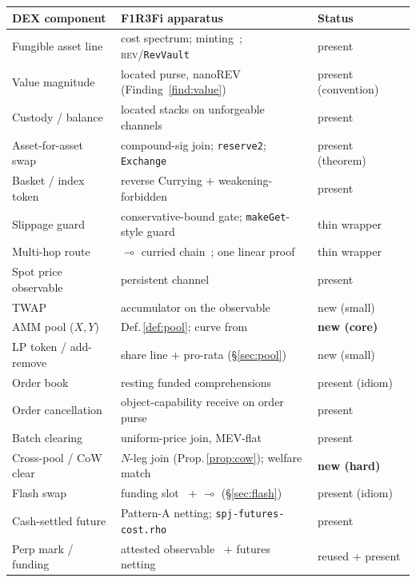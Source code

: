 \documentclass[11pt]{article}
\theoremstyle{definition}
\newcommand{\rev}{\textsc{rev}}
\newcommand{\lolli}{\ensuremath{\multimap}}
\begin{document}
\begin{table}[t]
\centering
\footnotesize
\setlength{\tabcolsep}{4pt}
\begin{tabular}{@{}p{}p{}p{}@{}}
\toprule
\textbf{DEX component} & \textbf{F1R3Fi apparatus} & \textbf{Status} \\
\midrule
Fungible asset line & cost spectrum; minting~\cite[\S2.4]{cost}; \rev/\texttt{RevVault} & present \\
Value magnitude & located purse, nanoREV (Finding~\ref{find:value}) & present (convention) \\
Custody / balance & located stacks on unforgeable channels~\cite[\S3.2]{finrho} & present \\
Asset-for-asset swap & compound-sig join; \texttt{reserve2}; \texttt{Exchange}~\cite[B.9]{cost} & present (theorem) \\
Basket / index token & reverse Currying + weakening-forbidden~\cite[\S4.8]{cost} & present \\
Slippage guard & conservative-bound gate; \texttt{makeGet}-style guard & thin wrapper \\
Multi-hop route & $\lolli$ curried chain~\cite[\S4.9]{cost}; one linear proof & thin wrapper \\
Spot price observable & persistent channel~\cite[\S2.2]{finrho} & present \\
TWAP & accumulator on the observable & new (small) \\
AMM pool ($X,Y$) & Def.\,\ref{def:pool}; curve from~\cite[\S6.1]{predmkt} & \textbf{new (core)} \\
LP token / add-remove & share line + pro-rata (\S\ref{sec:pool}) & new (small) \\
Order book & resting funded comprehensions~\cite[\S6.3]{predmkt} & present (idiom) \\
Order cancellation & object-capability receive on order purse~\cite[\S6.3]{predmkt} & present \\
Batch clearing & uniform-price join, MEV-flat~\cite[Prop.\,6.1]{predmkt} & present \\
Cross-pool / CoW clear & $N$-leg join (Prop.\,\ref{prop:cow}); welfare match & \textbf{new (hard)} \\
Flash swap & funding slot~\cite[\S5.7]{cost} $+$ $\lolli$ (\S\ref{sec:flash}) & present (idiom) \\
Cash-settled future & Pattern-A netting; \texttt{spj-futures-cost.rho} & present \\
Perp mark / funding & attested observable~\cite[\S4]{predmkt} + futures netting & reused + present \\

\end{tabular}
\end{table}
\end{document}
